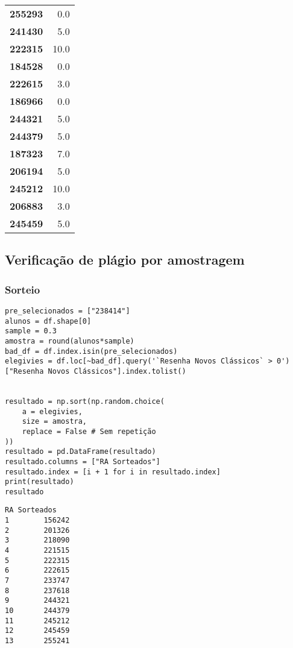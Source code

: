 \documentclass[11pt]{article}
\begin{document}
\begin{center}
\begin{longtable}{lr}
\textbf{255293} &                      0.0 \\
\textbf{241430} &                      5.0 \\
\textbf{222315} &                     10.0 \\
\textbf{184528} &                      0.0 \\
\textbf{222615} &                      3.0 \\
\textbf{186966} &                      0.0 \\
\textbf{244321} &                      5.0 \\
\textbf{244379} &                      5.0 \\
\textbf{187323} &                      7.0 \\
\textbf{206194} &                      5.0 \\
\textbf{245212} &                     10.0 \\
\textbf{206883} &                      3.0 \\
\textbf{245459} &                      5.0 \\
\end{longtable}
\end{center}
\subsection{Verificação de plágio por amostragem}
\label{sec:org6388944}
\subsubsection{Sorteio}
\label{sec:org925b853}

\begin{verbatim}
pre_selecionados = ["238414"]
alunos = df.shape[0]
sample = 0.3
amostra = round(alunos*sample)
bad_df = df.index.isin(pre_selecionados)
elegivies = df.loc[~bad_df].query('`Resenha Novos Clássicos` > 0')["Resenha Novos Clássicos"].index.tolist()


resultado = np.sort(np.random.choice(
    a = elegivies,
    size = amostra,
    replace = False # Sem repetição
))
resultado = pd.DataFrame(resultado)
resultado.columns = ["RA Sorteados"]
resultado.index = [i + 1 for i in resultado.index]
print(resultado)
resultado
\end{verbatim}

\begin{verbatim}
RA Sorteados
1        156242
2        201326
3        218090
4        221515
5        222315
6        222615
7        233747
8        237618
9        244321
10       244379
11       245212
12       245459
13       255241
\end{verbatim}
\end{document}
